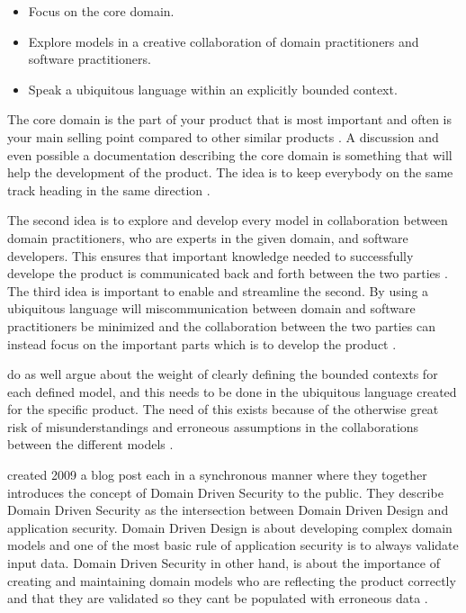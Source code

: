 \begin{itemize}
  \item Focus on the core domain.
  \item Explore models in a creative collaboration of domain practitioners and software practitioners.
  \item Speak a ubiquitous language within an explicitly bounded context.
\end{itemize}

The core domain is the part of your product that is most important and often is your main selling point compared to other similar products \parencite{millett_2015}. A discussion and even possible a documentation describing the core domain is something that will help the development of the product. The idea is to keep everybody on the same track heading in the same direction \parencite{EvansEric2004Dd:t}.

The second idea is to explore and develop every model in collaboration between domain practitioners, who are experts in the given domain, and software developers. This ensures that important knowledge needed to successfully develope the product is communicated back and forth between the two parties \parencite{millett_2015}. The third idea is important to enable and streamline the second. By using a ubiquitous language will miscommunication between domain and software practitioners be minimized and the collaboration between the two parties can instead focus on the important parts which is to develop the product \parencite{evans_2015}.

\textcite{evans_2015} do as well argue about the weight of clearly defining the bounded contexts for each defined model, and this needs to be done in the ubiquitous language created for the specific product. The need of this exists because of the otherwise great risk of misunderstandings and erroneous assumptions in the collaborations between the different models \parencite{millett_2015}.

\textcite{Wilander2009, Johnsson2009} created 2009 a blog post each in a synchronous manner where they together introduces the concept of Domain Driven Security to the public. They describe Domain Driven Security as the intersection between Domain Driven Design and application security. Domain Driven Design is about developing complex domain models and one of the most basic rule of application security is to always validate input data. Domain Driven Security in other hand, is about the importance of creating and maintaining domain models who are reflecting the product correctly and that they are validated so they cant be populated with erroneous data \parencite{Wilander2009, Johnsson2009, Arnor2016, Stendahl2016}.


